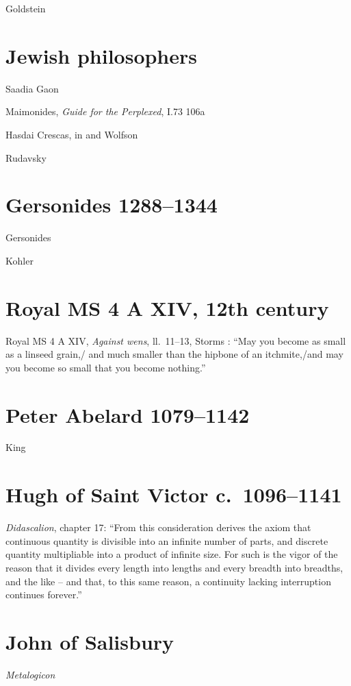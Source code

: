 \documentclass{article}
\begin{document}
Goldstein \cite{goldstein}


\section{Jewish philosophers}
Saadia Gaon \cite{gaon}

Maimonides, {\em Guide for the Perplexed}, I.73 106a



Hasdai Crescas, in \cite{harvey} and Wolfson \cite{wolfson1929}

Rudavsky \cite{rudavsky}





\section{Gersonides 1288--1344}
Gersonides \cite{gersonides}

Kohler \cite{kohler}


\section{Royal MS 4 A XIV, 12th century}
Royal MS 4 A XIV, {\em Against wens}, ll.~11--13, Storms \cite[p.~155, no.~4]{storms}: ``May you become as small as a linseed grain,/ and much smaller than the hipbone of an
itchmite,/and may you become so small that you become nothing.''


\section{Peter Abelard 1079--1142}
King \cite[p.~94]{abelard}

\section{Hugh of Saint Victor c.~1096--1141}
{\em Didascalion}, chapter 17: ``From this consideration derives the axiom that continuous quantity is
divisible into an infinite number of parts, and discrete quantity multipliable into a product of infinite
size. For such is the vigor of the reason that it divides every length into lengths and every breadth
into breadths, and the like -- and that, to this same reason, a continuity lacking interruption
continues forever.'' \cite[p.~58]{grant1974}

\section{John of Salisbury}
{\em Metalogicon}
\end{document}
